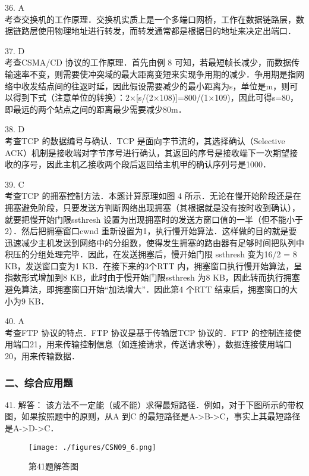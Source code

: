 36. A \\
考查交换机的工作原理．交换机实质上是一个多端口网桥，工作在数据链路层，数据链路层使用物理地址进行转发，而转发通常都是根据目的地址来决定出端口．

37. D \\
考查CSMA/CD 协议的工作原理．首先由例 8 可知，若最短帧长减少，而数据传输速率不变，则需要使冲突域的最大距离变短来实现争用期的减少．争用期是指网络中收发结点间的往返时延，因此假设需要减少的最小距离为s，单位是m，则可以得到下式（注意单位的转换）：2×[s/(2×108)]=800/(1×109)，因此可得s=80，即最远的两个站点之间的距离最少需要减少80m．

38. D \\
考查TCP 的数据编号与确认．TCP 是面向字节流的，其选择确认（Selective ACK）机制是接收端对字节序号进行确认，其返回的序号是接收端下一次期望接收的序号，因此主机乙接收两个段后返回给主机甲的确认序列号是1000．

39. C \\
考查TCP 的拥塞控制方法．本题计算原理如图 4 所示．无论在慢开始阶段还是在拥塞避免阶段，只要发送方判断网络出现拥塞（其根据就是没有按时收到确认），就要把慢开始门限ssthresh 设置为出现拥塞时的发送方窗口值的一半（但不能小于2）．然后把拥塞窗口cwnd 重新设置为1，执行慢开始算法．这样做的目的就是要迅速减少主机发送到网络中的分组数，使得发生拥塞的路由器有足够时间把队列中积压的分组处理完毕．因此，在发送拥塞后，慢开始门限 ssthresh 变为16/2 = 8 KB，发送窗口变为1 KB．在接下来的3个RTT 内，拥塞窗口执行慢开始算法，呈指数形式增加到8 KB，此时由于慢开始门限ssthresh 为8 KB，因此转而执行拥塞避免算法，即拥塞窗口开始“加法增大”．因此第4 个RTT 结束后，拥塞窗口的大小为9 KB．

40. A \\
考查FTP 协议的特点．FTP 协议是基于传输层TCP 协议的．FTP 的控制连接使用端口21，用来传输控制信息（如连接请求，传送请求等），数据连接使用端口20，用来传输数据．

\subsubsection{二、综合应用题}
41. 解答：
该方法不一定能（或不能）求得最短路径．例如，对于下图所示的带权图，如果按照题中的原则，从A 到C 的最短路径是A->B->C，事实上其最短路径是A->D->C．
\begin{figure}[ht]
\centering
\texttt{[image: ./figures/CSN09\_6.png]}
\caption{第41题解答图} \label{CSN09_fig6}
\end{figure}

